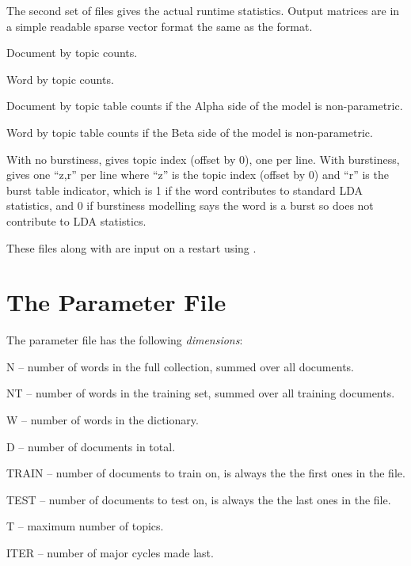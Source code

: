 \documentclass[a4paper,english]{article}
\begin{document}
The second set of files gives the actual runtime statistics.
Output matrices are in a simple readable sparse vector format
the same as the  format.
\begin{Description}\setlength{\itemsep}{0cm}
\item[\File{RepStem.ndt}] Document by topic counts.
\item[\File{RepStem.nwt}] Word by topic counts.
\item[\File{RepStem.tdt}] Document by topic table counts if
the Alpha side of the model is non-parametric.
\item[\File{RepStem.twt}] Word by topic table counts if
the Beta side of the model is non-parametric.
\item[\File{RepStem.zt}] With no burstiness, gives topic
index (offset by 0), one per line.  
With burstiness, gives one ``z,r'' per line where ``z'' is the
topic index (offset by 0) and ``r'' is the burst table indicator, 
which is 1 if the word
contributes to standard LDA statistics, and
0 if burstiness modelling says the word is a burst
so does not contribute to LDA statistics.
\end{Description}
These files along with  are input
on a restart using .

\section{The Parameter File}

The parameter file has the following \emph{dimensions}:
\begin{Description}[T]
\item{N} -- number of words in the full collection,
          summed over all documents.
\item{NT} -- number of words in the training set,
          summed over all training documents.
\item{W} -- number of words in the dictionary.
\item{D} -- number of documents in total.
\item{TRAIN} -- number of documents to train on, is always the
the first ones in the file.
\item{TEST} -- number of documents to test on, is always the
the last ones in the file.
\item{T} -- maximum number of topics.
\item{ITER} -- number of major cycles made last.


\end{Description}
\end{document}

